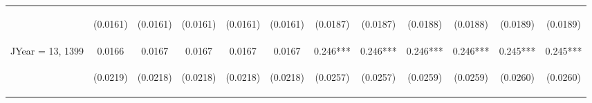 \documentclass[]{article}
\begin{document}
\begin{center}
\begin{tabular}{lccccccccccc}
\vspace{4pt} & \begin{footnotesize}(0.0161)\end{footnotesize} & \begin{footnotesize}(0.0161)\end{footnotesize} & \begin{footnotesize}(0.0161)\end{footnotesize} & \begin{footnotesize}(0.0161)\end{footnotesize} & \begin{footnotesize}(0.0161)\end{footnotesize} & \begin{footnotesize}(0.0187)\end{footnotesize} & \begin{footnotesize}(0.0187)\end{footnotesize} & \begin{footnotesize}(0.0188)\end{footnotesize} & \begin{footnotesize}(0.0188)\end{footnotesize} & \begin{footnotesize}(0.0189)\end{footnotesize} & \begin{footnotesize}(0.0189)\end{footnotesize} \\
JYear = 13, 1399 & 0.0166 & 0.0167 & 0.0167 & 0.0167 & 0.0167 & 0.246*** & 0.246*** & 0.246*** & 0.246*** & 0.245*** & 0.245*** \\
\vspace{4pt} & \begin{footnotesize}(0.0219)\end{footnotesize} & \begin{footnotesize}(0.0218)\end{footnotesize} & \begin{footnotesize}(0.0218)\end{footnotesize} & \begin{footnotesize}(0.0218)\end{footnotesize} & \begin{footnotesize}(0.0218)\end{footnotesize} & \begin{footnotesize}(0.0257)\end{footnotesize} & \begin{footnotesize}(0.0257)\end{footnotesize} & \begin{footnotesize}(0.0259)\end{footnotesize} & \begin{footnotesize}(0.0259)\end{footnotesize} & \begin{footnotesize}(0.0260)\end{footnotesize} & \begin{footnotesize}(0.0260)\end{footnotesize} \\

\end{tabular}
\end{center}
\end{document}

